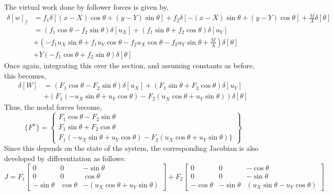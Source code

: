 \documentclass[10pt]{article}
\begin{document}
The virtual work done by follower forces is given by,
\begin{align}
  \delta[w]_f &= f_1\delta[(x-X)\cos\theta + (y-Y)\sin\theta] +
                f_2\delta[-(x-X)\sin\theta+(y-Y)\cos\theta] +
                \frac{M}{A}\delta[\theta]\nonumber\\ 
              &= (f_1\cos\theta-f_2\sin\theta)\delta[u_X] +
                (f_1\sin\theta+f_2\cos\theta)\delta[u_Y]\nonumber\\
              &+ (-f_1u_X\sin\theta + f_1u_Y\cos\theta -
                f_2u_X\cos\theta - f_2u_Y\sin\theta +
                \frac{M}{A})\delta[\theta]\nonumber\\
              &+ Y(-f_1\cos\theta +
                f_2\sin\theta)\delta[\theta]\label{eq:flwrk}
\end{align}
Once again, integrating this over the section, and assuming constants
as before, this becomes,
\begin{align}
  \delta[W] &= (F_1\cos\theta-F_2\sin\theta)\delta[u_X] +
              (F_1\sin\theta+F_2\cos\theta)\delta[u_Y]\nonumber\\
            &+ (F_1(-u_X\sin\theta+u_Y\cos\theta) -
              F_2(u_X\cos\theta+u_Y\sin\theta))\delta[\theta]
  \label{eq:flvwrk}
\end{align}
Thus, the nodal forces become,
\begin{equation*}
\{F^n\} = \begin{Bmatrix} F_1\cos\theta - F_2\sin\theta\\
  F_1\sin\theta + F_2\cos\theta\\ F_1(-u_X\sin\theta+u_Y\cos\theta) -
  F_2(u_X\cos\theta + u_Y\sin\theta)\} \end{Bmatrix}
\end{equation*}
Since this depends on the state of the system, the corresponding
Jacobian is also developed by differentiation as follows:
\begin{equation*}
  J = F_1\begin{bmatrix} 0&0&-\sin\theta\\ 0&0&\cos\theta\\
    -\sin\theta&\cos\theta&-(u_X\cos\theta +
    u_Y\sin\theta) \end{bmatrix} + F_2\begin{bmatrix}
    0&0&-\cos\theta\\ 0&0&-\sin\theta\\
    -\cos\theta&-\sin\theta&(u_X\sin\theta-u_Y\cos\theta) \end{bmatrix}
\end{equation*}
\end{document}
